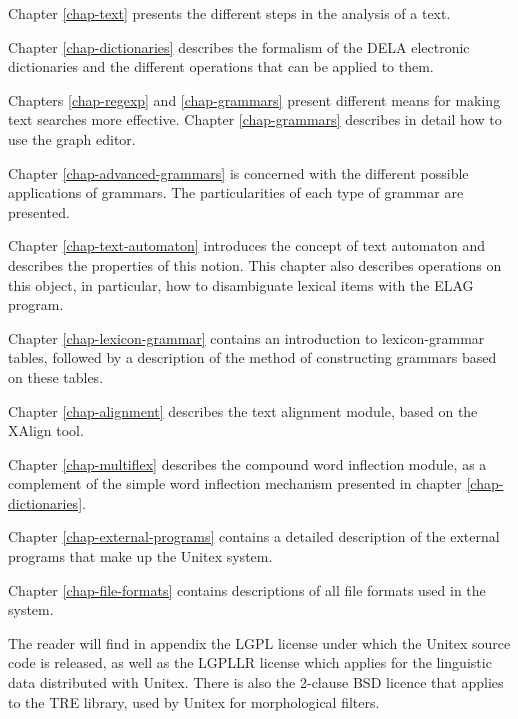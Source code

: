 \bigskip \noindent Chapter \ref{chap-text} presents the different steps in the
analysis of  a text.

\bigskip \noindent Chapter \ref{chap-dictionaries} describes the formalism of
the DELA electronic dictionaries and the different operations that can be applied to them.

\bigskip \noindent Chapters \ref{chap-regexp} and \ref{chap-grammars}
present different means for making text searches more effective. 
Chapter \ref{chap-grammars} describes in detail how to use the graph
editor.

\bigskip \noindent Chapter \ref{chap-advanced-grammars} is concerned
with the different possible applications of grammars. The particularities of each type of grammar are
presented.

\bigskip \noindent Chapter \ref{chap-text-automaton} introduces the 
concept of text automaton and describes the properties of this notion. This chapter also describes 
operations on this object, in particular, how to disambiguate lexical items with
the ELAG program.

\bigskip \noindent Chapter \ref{chap-lexicon-grammar} contains an
introduction to lexicon-grammar tables, followed by a description of the method of constructing grammars based on these
tables.

\bigskip \noindent Chapter \ref{chap-alignment} describes the text
alignment module, based on the XAlign tool.

\bigskip \noindent Chapter \ref{chap-multiflex} describes the compound word
inflection module, as a complement of the simple word inflection mechanism
presented in chapter \ref{chap-dictionaries}.

\bigskip \noindent Chapter \ref{chap-external-programs} contains a
detailed description of the external programs that make up the Unitex system.

\bigskip \noindent Chapter \ref{chap-file-formats} contains
descriptions of all file formats used in the system. 


\bigskip \noindent The reader will find in appendix the LGPL license
under which the Unitex source code is released, as well as the LGPLLR license
which applies for the linguistic data distributed with Unitex. There is also
the 2-clause BSD licence that applies to the TRE library, used by Unitex for 
morphological filters.
